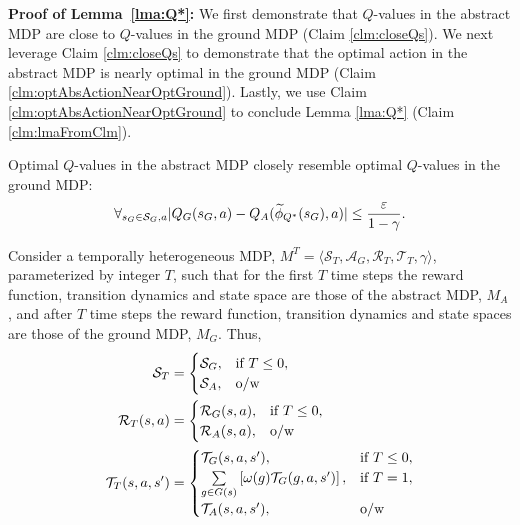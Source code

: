 \textbf{Proof of Lemma~\ref{lma:Q*}:}
We first demonstrate that $Q$-values in the abstract \ac{MDP} are close to $Q$-values in the ground \ac{MDP} (Claim \ref{clm:closeQs}). We next leverage Claim \ref{clm:closeQs} to demonstrate that the optimal action in the abstract \ac{MDP} is nearly optimal in the ground \ac{MDP}  (Claim \ref{clm:optAbsActionNearOptGround}). Lastly, we use Claim \ref{clm:optAbsActionNearOptGround} to conclude Lemma \ref{lma:Q*} (Claim \ref{clm:lmaFromClm}).
\begin{clm}
\label{clm:closeQs}
Optimal $Q$-values in the abstract \ac{MDP} closely resemble optimal $Q$-values in the ground \ac{MDP}:
\begin{equation}
\label{eq:Q*Claim1}
\forall_{s_G \in \mathcal{S}_G, a} |Q_G(s_G, a) - Q_A(\widetilde \phi_{Q^*}(s_G), a)| \leq \frac{\varepsilon}{1-\gamma}.
\end{equation}
\end{clm}

Consider a temporally heterogeneous \ac{MDP}, $M^T = \langle \mathcal{S}_T, \mathcal{A}_G, \mathcal{R}_T, \mathcal{T}_T, \gamma \rangle$, parameterized by integer $T$, such that for the first $T$ time steps the reward function, transition dynamics and state space are those of the abstract MDP, $M_A$, and after $T$ time steps the reward function, transition dynamics and state spaces are those of the ground MDP, $M_G$. Thus,
\begin{align*}
\mathcal{S}_T &= \begin{cases}
\mathcal{S}_G,& \text{if } T \leq 0, \\
\mathcal{S}_A,& \text{o/w}
\end{cases}\\
\mathcal{R}_T(s,a) &= \begin{cases}
\mathcal{R}_G(s,a),& \text{if } T \leq 0, \\
\mathcal{R}_A(s, a),& \text{o/w}
\end{cases}\\
\mathcal{T}_T(s,a,s') &= \begin{cases}
\mathcal{T}_G(s,a,s'),& \text{if }T \leq 0, \\
\underset{{g \in G(s)}}{\sum}\left[\omega(g)\mathcal{T}_G(g, a, s')\right],& \text{if } T = 1, \\
\mathcal{T}_A(s,a,s'),& \text{o/w}
\end{cases}\\
\end{align*}

